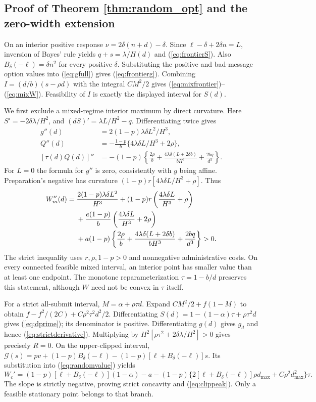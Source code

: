 \documentclass[11pt]{article}
\begin{document}
\subsection{Proof of Theorem \ref{thm:random_opt} and the zero-width extension}\label{app:random_opt}
On an interior positive response $\nu=2\delta(n+d)-\delta$. Since $\ell-\delta+2\delta n=L$, inversion of Bayes' rule yields $q+s=\lambda/H(d)$ and (\ref{eq:frontierS}). Also $B_\delta(-\ell)=\delta n^2$ for every positive $\delta$. Substituting the positive and bad-message option values into (\ref{eq:gfull}) gives (\ref{eq:frontierg}). Combining $I=(d/b)(s-\rho d)$ with the integral $CM^2/2$ gives (\ref{eq:mixfrontier})--(\ref{eq:mixW}). Feasibility of $I$ is exactly the displayed interval for $S(d)$.

We first exclude a mixed-regime interior maximum by direct curvature. Here $S'=-2\delta\lambda/H^2$, and $(dS)'=\lambda L/H^2-q$. Differentiating twice gives
\begin{align*}
g''(d)&=2(1-p)\lambda\delta L^2/H^3,\\
Q''(d)&=-\frac{1-p}{b}\{4\lambda\delta L/H^3+2\rho\},\\
[\tau(d)Q(d)]''&=-(1-p)\left\{\frac{2\rho}{b}+
\frac{4\lambda\delta(L+2\delta b)}{bH^3}+\frac{2bq}{d^3}\right\}.
\end{align*}
For $L=0$ the formula for $g''$ is zero, consistently with $g$ being affine. Preparation's negative has curvature $(1-p)r[4\lambda\delta L/H^3+\rho]$. Thus
\begin{align}
W_m''(d)={}&\frac{2(1-p)\lambda\delta L^2}{H^3}
 +(1-p)r\left(\frac{4\lambda\delta L}{H^3}+\rho\right)\notag\\
&+\frac{e(1-p)}b\left(\frac{4\lambda\delta L}{H^3}+2\rho\right)\notag\\
&+a(1-p)\left\{\frac{2\rho}b+
\frac{4\lambda\delta(L+2\delta b)}{bH^3}+\frac{2bq}{d^3}\right\}>0.\label{eq:mixconvex}
\end{align}
The strict inequality uses $r,\rho,1-p>0$ and nonnegative administrative costs. On every connected feasible mixed interval, an interior point has smaller value than at least one endpoint. The monotone reparameterization $\tau=1-b/d$ preserves this statement, although $W$ need not be convex in $\tau$ itself.

For a strict all-submit interval, $M=\alpha+\rho\tau d$. Expand $CM^2/2+f(1-M)$ to obtain $f-f^2/(2C)+C\rho^2\tau^2d^2/2$. Differentiating $S(d)=1-(1-\alpha)\tau+\rho\tau^2d$ gives (\ref{eq:dprime}); its denominator is positive. Differentiating $g(d)$ gives $g_d$ and hence (\ref{eq:strictderivative}). Multiplying by $H^2[\rho\tau^2+2\delta\lambda/H^2]>0$ gives precisely $R=0$. On the upper-clipped interval, $\mathcal G(s)=pv+(1-p)B_\delta(-\ell)-(1-p)[\ell+B_\delta(-\ell)]s$. Its substitution into (\ref{eq:randomvalue}) yields
\[
W_c'=(1-p)[\ell+B_\delta(-\ell)](1-\alpha)-a
 -(1-p)\{2[\ell+B_\delta(-\ell)]\rho d_{\max}+C\rho^2d_{\max}^2\}\tau.
\]
The slope is strictly negative, proving strict concavity and (\ref{eq:clippeak}). Only a feasible stationary point belongs to that branch.
\end{document}
